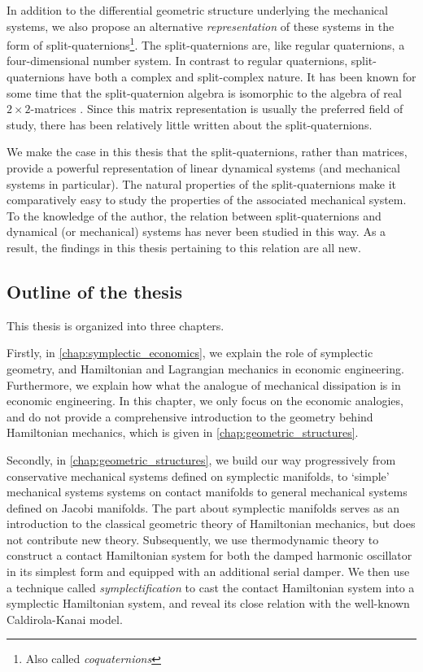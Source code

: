 In addition to the differential geometric structure underlying the mechanical systems, we also propose an alternative \emph{representation} of these systems in the form of split-quaternions\footnote{Also called \emph{coquaternions}}. The split-quaternions are, like regular quaternions, a four-dimensional number system. In contrast to regular quaternions, split-quaternions have both a complex and split-complex nature. It has been known for some time that the split-quaternion algebra is isomorphic to the algebra of real $2\times2$-matrices \cite{Jafari2014}. Since this matrix representation is usually the preferred field of study, there has been relatively little written about the split-quaternions. 

We make the case in this thesis that the split-quaternions, rather than matrices, provide a powerful representation of linear dynamical systems (and mechanical systems in particular). The natural properties of the split-quaternions make it comparatively easy to study the properties of the associated mechanical system. To the knowledge of the author, the relation between split-quaternions and dynamical (or mechanical) systems has never been studied in this way. As a result, the findings in this thesis pertaining to this relation are all new.

\subsection*{Outline of the thesis}
This thesis is organized into three chapters. 

Firstly, in \cref{chap:symplectic_economics}, we explain the role of symplectic geometry, and Hamiltonian and Lagrangian mechanics in economic engineering. Furthermore, we explain how what the analogue of mechanical dissipation is in economic engineering. In this chapter, we only focus on the economic analogies, and do not provide a comprehensive introduction to the geometry behind Hamiltonian mechanics, which is given in \cref{chap:geometric_structures}. %

Secondly, in \cref{chap:geometric_structures}, we build our way progressively from conservative mechanical systems defined on symplectic manifolds, to `simple' mechanical systems systems on contact manifolds to general mechanical systems defined on Jacobi manifolds. The part about symplectic manifolds serves as an introduction to the classical geometric theory of Hamiltonian mechanics, but does not contribute new theory. Subsequently, we use thermodynamic theory to construct a contact Hamiltonian system for both the damped harmonic oscillator in its simplest form and equipped with an additional serial damper. We then use a technique called \emph{symplectification} to cast the contact Hamiltonian system into a symplectic Hamiltonian system, and reveal its close relation with the well-known Caldirola-Kanai model.

